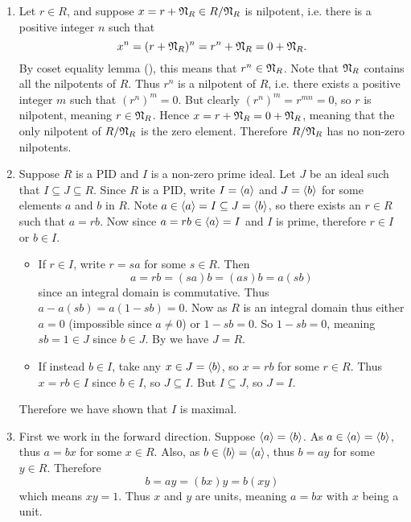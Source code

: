 \begin{enumerate}
    \item Let $r \in R$, and suppose $x = r + \mathfrak{N}_{R} \in R/\mathfrak{N}_{R}$ is nilpotent, i.e. there is a positive integer $n$ such that
    \[
        x^n = (r + \mathfrak{N}_{R})^n = r^n + \mathfrak{N}_{R} = 0 + \mathfrak{N}_{R}.
    \]
    By coset equality lemma (), this means that $r^n \in \mathfrak{N}_{R}$. Note that $\mathfrak{N}_{R}$ contains all the nilpotents of $R$. Thus $r^n$ is a nilpotent of $R$, i.e. there exists a positive integer $m$ such that $(r^n)^m = 0$. But clearly $(r^n)^m = r^{mn} = 0$, so $r$ is nilpotent, meaning $r \in \mathfrak{N}_{R}$. Hence $x = r + \mathfrak{N}_{R} = 0 + \mathfrak{N}_{R}$, meaning that the only nilpotent of $R/\mathfrak{N}_{R}$ is the zero element. Therefore $R/\mathfrak{N}_{R}$ has no non-zero nilpotents.

    \item Suppose $R$ is a PID and $I$ is a non-zero prime ideal. Let $J$ be an ideal such that $I \subseteq J \subseteq R$. Since $R$ is a PID, write $I = \left\langle a\right\rangle$ and $J = \left\langle b\right\rangle$ for some elements $a$ and $b$ in $R$. Note $a \in \left\langle a\right\rangle = I \subseteq J = \left\langle b\right\rangle$, so there exists an $r \in R$ such that $a = rb$. Now since $a = rb \in \left\langle a\right\rangle = I$ and $I$ is prime, therefore $r \in I$ or $b \in I$.
    \begin{itemize}
        \item If $r \in I$, write $r = sa$ for some $s \in R$. Then
        \[
            a = rb = (sa)b = (as)b = a(sb)
        \]
        since an integral domain is commutative. Thus $a - a(sb) = a(1-sb) = 0$. Now as $R$ is an integral domain thus either $a = 0$ (impossible since $a \neq 0$) or $1-sb = 0$. So $1-sb = 0$, meaning $sb = 1 \in J$ since $b \in J$. By  we have $J = R$.
        \item If instead $b \in I$, take any $x \in J = \left\langle b\right\rangle$, so $x = rb$ for some $r \in R$. Thus $x = rb \in I$ since $b \in I$, so $J \subseteq I$. But $I \subseteq J$, so $J = I$.
    \end{itemize}
    Therefore we have shown that $I$ is maximal.

    \item First we work in the forward direction. Suppose $\left\langle a\right\rangle = \left\langle b\right\rangle$. As $a \in \left\langle a\right\rangle = \left\langle b\right\rangle$, thus $a = bx$ for some $x \in R$. Also, as $b \in \left\langle b\right\rangle = \left\langle a\right\rangle$, thus $b = ay$ for some $y \in R$. Therefore
    \[
        b = ay = (bx)y = b(xy)
    \]
    which means $xy = 1$. Thus $x$ and $y$ are units, meaning $a = bx$ with $x$ being a unit.


\end{enumerate}
